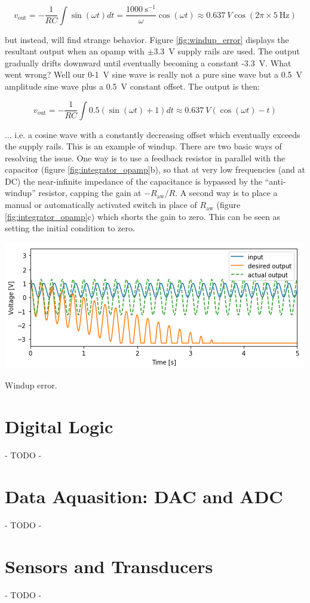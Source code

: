 \documentclass{tufte-book}
\begin{document}
$$
v_\text{out} = -\frac{1}{RC}\int\sin(\omega t)dt = \frac{1000~\text{s}^{-1}}{\omega}\cos(\omega t) \approx 0.637~V\cos(2\pi\times5~\text{Hz})
$$

\noindent but instead, will find strange behavior. Figure \ref{fig:windup_error} displays the resultant output when an opamp with $\pm3.3$~V supply rails are used. The output gradually drifts downward until eventually becoming a constant -3.3~V. What went wrong? Well our 0-1~V sine wave is really not a pure sine wave but a 0.5~V amplitude sine wave plus a 0.5~V constant offset. The output is then:

$$
v_\text{out} = -\frac{1}{RC}\int0.5\left(\sin(\omega t) + 1\right)dt \approx 0.637~V\left(\cos(\omega t) - t\right)
$$

\noindent ... i.e. a cosine wave with a constantly decreasing offset which eventually exceeds the supply rails. This is an example of windup. There are two basic ways of resolving the issue. One way is to use a feedback resistor in parallel with the capacitor (figure \ref{fig:integrator_opamp}b), so that at very low frequencies (and at DC) the near-infinite impedance of the capacitance is bypassed by the ``anti-windup'' resistor, capping the gain at $-R_\text{aw}/R$. A second way is to place a manual or automatically activated switch in place of $R_\text{aw}$ (figure \ref{fig:integrator_opamp}c) which shorts the gain to zero. This can be seen as setting the initial condition to zero.

\begin{marginfigure}%
  \includegraphics[width=\linewidth]{windup_error}
  \caption{Windup error.}
  \label{fig:windup_error}
\end{marginfigure}

\chapter{Digital Logic}
- TODO -

\chapter{Data Aquasition: DAC and ADC}
- TODO -

\chapter{Sensors and Transducers}
- TODO -


\backmatter





\printindex
\end{document}
